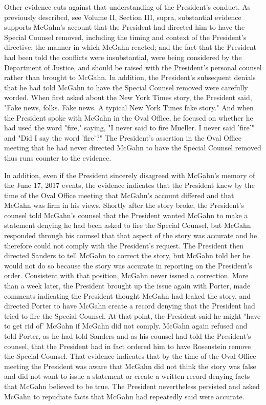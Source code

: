 Other evidence cuts against that understanding of the President's conduct.
As previously described, see Volume II, Section III, supra, substantial evidence supports McGahn's account that the President had directed him to have the Special Counsel removed, including the timing and context of the President's directive;
the manner in which McGahn reacted;
and the fact that the President had been told the conflicts were insubstantial, were being considered by the Department of Justice, and should be raised with the President's personal counsel rather than brought to McGahn.
In addition, the President's subsequent denials that he had told McGahn to have the Special Counsel removed were carefully worded.
When first asked about the New York Times story, the President said, "Fake news, folks.
Fake news.
A typical New York Times fake story." And when the President spoke with McGahn in the Oval Office, he focused on whether he had used the word "fire," saying, "I never said to fire Mueller.
I never said 'fire'" and "Did I say the word 'fire'?" The President's assertion in the Oval Office meeting that he had never directed McGahn to have the Special Counsel removed thus runs counter to the evidence.

In addition, even if the President sincerely disagreed with McGahn's memory of the June 17, 2017 events, the evidence indicates that the President knew by the time of the Oval Office
meeting that McGahn's account differed and that McGahn was firm in his views.
Shortly after the story broke, the President's counsel told McGahn's counsel that the President wanted McGahn to make a statement denying he had been asked to fire the Special Counsel, but McGahn responded through his counsel that that aspect of the story was accurate and he therefore could not comply with the President's request.
The President then directed Sanders to tell McGahn to correct the story, but McGahn told her he would not do so because the story was accurate in reporting on the President's order.
Consistent with that position, McGahn never issued a correction.
More than a week later, the President brought up the issue again with Porter, made comments indicating the President thought McGahn had leaked the story, and directed Porter to have McGahn create a record denying that the President had tried to fire the Special Counsel.
At that point, the President said he might "have to get rid of' McGahn if McGahn did not comply.
McGahn again refused and told Porter, as he had told Sanders and as his counsel had told the President's counsel, that the President had in fact ordered him to have Rosenstein remove the Special Counsel.
That evidence indicates that by the time of the Oval Office meeting the President was aware that McGahn did not think the story was false and did not want to issue a statement or create a written record denying facts that McGahn believed to be true.
The President nevertheless persisted and asked McGahn to repudiate facts that McGahn had repeatedly said were accurate.

